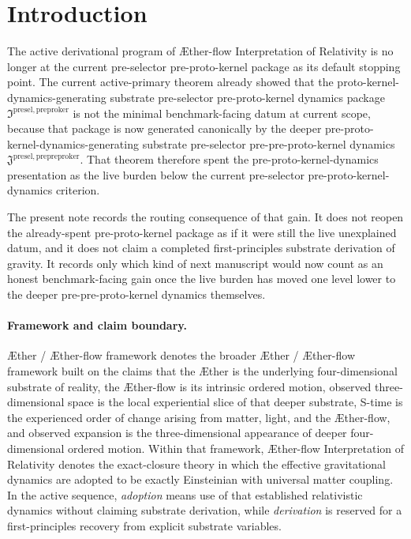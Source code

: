 \documentclass[11pt]{article}
\newcommand{\Aether}{\AE{}ther}
\newcommand{\Aflow}{\AE{}ther-flow}
\newcommand{\TheoryName}{\Aflow{} Interpretation of Relativity}
\newcommand{\TheoryProgram}{\Aether{} / \Aflow{} framework}
\newcommand{\PrePreProtoKernelPackage}{\mathfrak J^{\mathrm{presel,prepreproker}}}
\newcommand{\PreProtoKernelPackage}{\mathfrak I^{\mathrm{presel,preproker}}}
\begin{document}
\section{Introduction}

The active derivational program of \TheoryName{} is no longer at the current pre-selector pre-proto-kernel package as its default stopping point. The current active-primary theorem already showed that the proto-kernel-dynamics-generating substrate pre-selector pre-proto-kernel dynamics package \(\PreProtoKernelPackage\) is not the minimal benchmark-facing datum at current scope, because that package is now generated canonically by the deeper pre-proto-kernel-dynamics-generating substrate pre-selector pre-pre-proto-kernel dynamics \(\PrePreProtoKernelPackage\). That theorem therefore spent the pre-proto-kernel-dynamics presentation as the live burden below the current pre-selector pre-proto-kernel-dynamics criterion.

The present note records the routing consequence of that gain. It does not reopen the already-spent pre-proto-kernel package as if it were still the live unexplained datum, and it does not claim a completed first-principles substrate derivation of gravity. It records only which kind of next manuscript would now count as an honest benchmark-facing gain once the live burden has moved one level lower to the deeper pre-pre-proto-kernel dynamics themselves.

\paragraph{Framework and claim boundary.}
\TheoryProgram{} denotes the broader \Aether{} / \Aflow{} framework built on the claims that the \Aether{} is the underlying four-dimensional substrate of reality, the \Aflow{} is its intrinsic ordered motion, observed three-dimensional space is the local experiential slice of that deeper substrate, S-time is the experienced order of change arising from matter, light, and the \Aflow{}, and observed expansion is the three-dimensional appearance of deeper four-dimensional ordered motion. Within that framework, \TheoryName{} denotes the exact-closure theory in which the effective gravitational dynamics are adopted to be exactly Einsteinian with universal matter coupling. In the active sequence, \emph{adoption} means use of that established relativistic dynamics without claiming substrate derivation, while \emph{derivation} is reserved for a first-principles recovery from explicit substrate variables.
\end{document}
